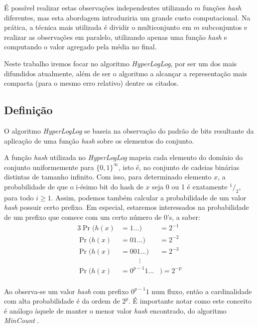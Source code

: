 É possível realizar estas observações independentes utilizando $m$ funções \emph{hash} diferentes, mas esta abordagem introduziria um grande custo computacional. Na prática, a técnica mais utilizada é dividir o multiconjunto em $m$ subconjuntos e realizar as observações em paralelo, utilizando apenas uma função \emph{hash} e computando o valor agregado pela média no final.

Neste trabalho iremos focar no algoritmo \emph{HyperLogLog}, por ser um dos mais difundidos atualmente, além de ser o algoritmo a alcançar a representação mais compacta (para o mesmo erro relativo) dentre os citados.

\subsection{Definição}

O algoritmo \emph{HyperLogLog} se baseia na observação do padrão de bits resultante da aplicação de uma função \emph{hash} sobre os elementos do conjunto. 

A função \emph{hash} utilizada no \emph{HyperLogLog} mapeia cada elemento do domínio do conjunto uniformemente para $\{0, 1\}^\infty$, isto é, no conjunto de cadeias binárias distintas de tamanho infinito. Com isso, para determinado elemento $x$, a probabilidade de que o i-ésimo bit do hash de $x$ seja 0 ou 1 é exatamente $^1/_2$, para todo $i \geq 1$. Assim, podemos também calcular a probabilidade de um valor \emph{hash} possuir certo prefixo. Em especial, estaremos interessados na probabilidade de um prefixo que comece com um certo número de 0's, a saber:
\begin{alignat*}{3}
\Pr(h(x) &= 1...) &= 2^{-1} \\
\Pr(h(x) &= 01...) &= 2^{-2} \\
\Pr(h(x) &= 001...) &= 2^{-3} \\
& \phantom{aaaaa}\vdots \\
\Pr(h(x) &= 0^{p-1}1...&) = 2^{-p} \\
\end{alignat*}

Ao observa-se um valor \emph{hash} com prefixo $0^{p-1}1$ num fluxo, então a cardinalidade com alta probabilidade é da ordem de $2^p$. É importante notar como este conceito é análogo àquele de manter o menor valor \emph{hash} encontrado, do algoritmo \emph{MinCount}  \cite{giroire2009order}.

